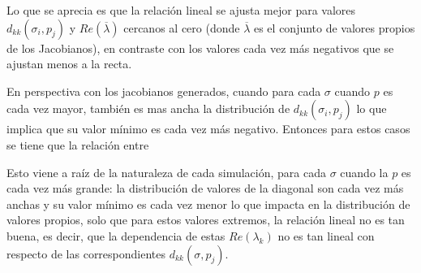 Lo que se aprecia es que la relación lineal se ajusta mejor para valores $d_{kk}(\sigma_i,p_j)$ y $Re(\overline{\lambda})$ cercanos al cero (donde $\overline{\lambda}$ es el conjunto de valores propios de los Jacobianos), en contraste con los valores cada vez más negativos que se ajustan menos a la recta. 

En perspectiva con los jacobianos generados, cuando para cada $\sigma$ cuando $p$ es cada vez mayor, también es mas ancha la distribución de $d_{kk}(\sigma_i,p_j)$ lo que implica que su valor mínimo es cada vez más negativo. Entonces para estos casos se tiene que la relación entre

Esto viene a raíz de la naturaleza de cada simulación, para cada $\sigma$ cuando la $p$ es cada vez más grande: la distribución de valores de la diagonal son cada vez más anchas y su valor mínimo es cada vez menor lo que impacta en la distribución de valores propios, solo que para estos valores extremos, la relación lineal no es tan buena, es decir, que la dependencia de estas $Re(\lambda_k)$ no es tan lineal con respecto de las correspondientes $d_{kk}(\sigma,p_j)$.
